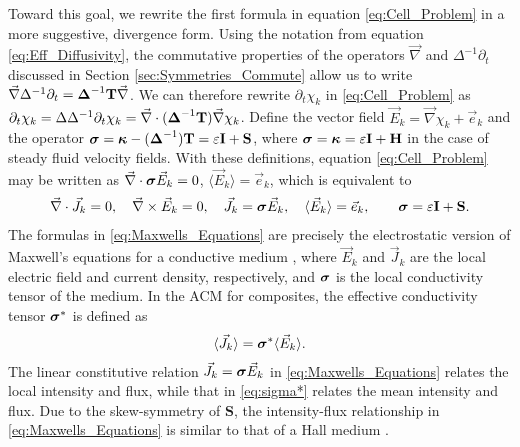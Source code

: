 \documentclass[11pt]{amsart}
\newcommand{\Tb}{\mathbf{T}}
\newcommand{\Hb}{\mathbf{H}}
\newcommand{\Ib}{\mathbf{I}}
\newcommand{\Sb}{\mathbf{S}}
\newcommand\bsig{\mbox{\boldmath${\sigma}$}}
\newcommand\bDelta{\mbox{\boldmath${\Delta}$}}
\newcommand\bkappa{\mbox{\boldmath${\kappa}$}}
\begin{document}
Toward this goal, we rewrite the first formula in equation
\eqref{eq:Cell_Problem} in a more suggestive, divergence form. Using
the notation from equation \eqref{eq:Eff_Diffusivity}, the commutative
properties of the operators $\vec{\nabla}$ and $\Delta^{-1}\partial_t$ discussed in
Section \ref{sec:Symmetries_Commute} allow us to write
$\vec{\nabla}\Delta^{-1}\partial_t=\bDelta^{-1}\Tb\vec{\nabla}$. We can therefore rewrite
$\partial_t\chi_k$ in \eqref{eq:Cell_Problem} as \cite{Fannjiang:SIAM_JAM:333}  
$\partial_t\chi_k=\Delta\Delta^{-1}\partial_t\chi_k=\vec{\nabla}\cdot(\bDelta^{-1}\Tb)\vec{\nabla}\chi_k$. Define the
vector field $\vec{E}_k=\vec{\nabla}\chi_k+\vec{e}_k$ and the operator
$\bsig=\bkappa-(\bDelta^{-1})\Tb=\varepsilon\Ib+\Sb$, where
$\bsig=\bkappa=\varepsilon\Ib+\Hb$ in the case of steady fluid velocity
fields. With these definitions, equation \eqref{eq:Cell_Problem} may
be written as  $\vec{\nabla}\cdot\bsig\vec{E}_k=0$, $\langle\vec{E}_k\rangle=\vec{e}_k$,
which is equivalent to    
%
\begin{align}\label{eq:Maxwells_Equations}    
  \vec{\nabla}\cdot\vec{J}_k=0, \quad
  \vec{\nabla}\times\vec{E}_k=0, \quad
  \vec{J}_k=\bsig\vec{E}_k,\quad
  \langle\vec{E}_k\rangle=\vec{e}_k,\qquad
  \bsig%
       =\varepsilon\Ib+\Sb.
\end{align}
%
The formulas in \eqref{eq:Maxwells_Equations} are precisely the
electrostatic version of Maxwell's equations for a conductive medium
\cite{Golden:CMP-473}, where $\vec{E}_k$ and $\vec{J}_k$ are the local
electric field and current density, respectively, and $\bsig$ is the
local conductivity tensor of the medium. In the ACM for composites,
the effective conductivity tensor $\bsig^*$ is defined as
% 
\begin{align}\label{eq:sigma*}
  \langle\vec{J}_k\rangle=\bsig^*\langle\vec{E}_k\rangle.
\end{align}
%
The linear constitutive relation $\vec{J}_k=\bsig\vec{E}_k$ in
\eqref{eq:Maxwells_Equations} relates the local intensity and flux,
while that in \eqref{eq:sigma*} relates the mean intensity and
flux. Due to the skew-symmetry of $\Sb$, the intensity-flux
relationship in \eqref{eq:Maxwells_Equations} is similar to that of a
Hall medium \cite{Isichenko:JNS:1991:375}.
\end{document}
